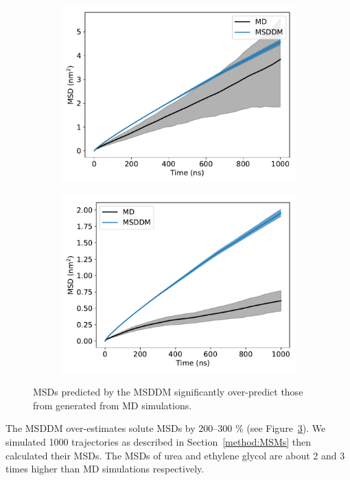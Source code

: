 \documentclass{article}
\begin{document}
\begin{figure}
\begin{subfigure}{0.45\textwidth}
  \includegraphics[width=\textwidth]{MET_msddm.pdf}
  \caption{}\label{fig:MET_msddm}
  \end{subfigure}
  \begin{subfigure}{0.45\textwidth}
  \includegraphics[width=\textwidth]{ACH_msddm.pdf}
  \caption{}\label{fig:ACH_msddm}
  \end{subfigure}
  \caption{MSDs predicted by the MSDDM significantly over-predict those
  from generated from MD simulations.}\label{fig:msddm_performance}
  \end{figure}
  
  The MSDDM over-estimates solute MSDs by 200--300 \% (see Figure~\ref{fig:msddm_performance}). 
  We simulated 1000 trajectories as described in Section~\ref{method:MSMs} then
  calculated their MSDs. The MSDs of urea and ethylene glycol are about 2 and 3 times
  higher than MD simulations respectively.
 
\end{document}
